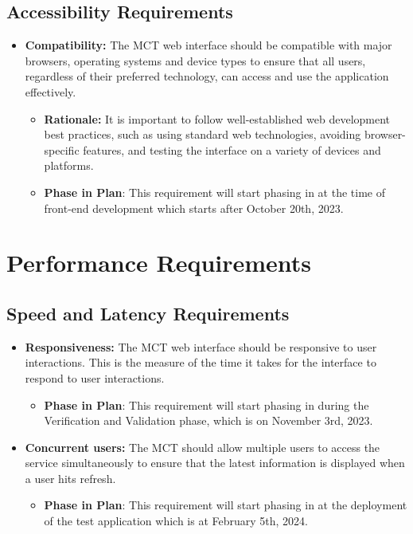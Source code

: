 \documentclass[12pt]{article}
\begin{document}
\subsection{Accessibility Requirements}

\begin{itemize}
    \item \textbf{Compatibility: }The MCT web interface should be compatible with major browsers, operating systems and device types to ensure that all users, regardless of their preferred technology, can access and use the application effectively.
    \begin{itemize}
        \item \textbf{Rationale: }It is important to follow well-established web development best practices, such as using standard web technologies, avoiding browser-specific features, and testing the interface on a variety of devices and platforms.
        \item \textbf{Phase in Plan}: This requirement will start phasing in at the time of front-end development which starts after October 20th, 2023.
    \end{itemize}
\end{itemize}



\section{Performance Requirements}
\subsection{Speed and Latency Requirements}

\begin{itemize}
    \item \textbf{Responsiveness: }The MCT web interface should be responsive to user interactions. This is the measure of the time it takes for the interface to respond to user interactions.
    \begin{itemize}
        \item \textbf{Phase in Plan}: This requirement will start phasing in during the Verification and Validation phase, which is on November 3rd, 2023.
    \end{itemize}
    \item \textbf{Concurrent users:} The MCT should allow multiple users to access the service simultaneously to ensure that the latest information is displayed when a user hits refresh.
    \begin{itemize}
        \item \textbf{Phase in Plan}: This requirement will start phasing in at the deployment of the test application which is at February 5th, 2024.
    \end{itemize}
\end{itemize}
\end{document}
